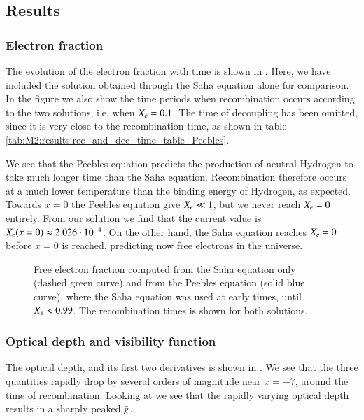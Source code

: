 \subsection{Results}\label{ssec:M2:results}


\subsubsection{Electron fraction} \label{sssec:M2:results:electron_fraction}
The evolution of the electron fraction with time is shown in . Here, we have included the solution obtained through the Saha equation alone for comparison. In the figure we also show the time periods when recombination occurs according to the two solutions, i.e. when $X_e=0.1$. The time of decoupling has been omitted, since it is very close to the recombination time, as shown in table \ref{tab:M2:results:rec_and_dec_time_table_Peebles}. 

We see that the Peebles equation predicts the production of neutral Hydrogen to take much longer time than the Saha equation. Recombination therefore occurs at a much lower temperature than the binding energy of Hydrogen, as expected. Towards $x=0$ the Peebles equation give $X_e\ll1$, but we never reach $X_e=0$ entirely. From our solution we find that the current value is $X_e(x=0)\approx 2.026\cdot10^{-4}$. On the other hand, the Saha equation reaches $X_e=0$ before $x=0$ is reached, predicting now free electrons in the universe. 

\begin{figure}[ht!]
    \caption{Free electron fraction computed from the Saha equation only (dashed green curve) and from the Peebles equation (solid blue curve), where the Saha equation was used at early times, until $X_e<0.99$. The recombination times is shown for both solutions.}
    \label{fig:M2:results:recombination_compare_Xe_peebles_saha}
\end{figure}

\subsubsection{Optical depth and visibility function} \label{sssec:M2:results:optical_depth_and_visibility_function}
The optical depth, and its first two derivatives is shown in . We see that the three quantities rapidly drop by several orders of magnitude near $x=-7$, around the time of recombination. Looking at  we see that the rapidly varying optical depth results in a sharply peaked $\tilde{g}$. 

